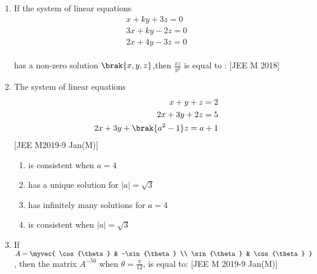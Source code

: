 \begin{enumerate}
\begin{enumerate}
\end{enumerate} 
\item If the system of linear equations \\
\begin{align}x+ky+3z=0 \\
3x+ky-2z=0 \\
2x+4y-3z=0 \end{align}\\
has a non-zero solution $$,then $$ is equal to :
\hfill{[JEE M 2018]}
\begin{enumerate}
\end{enumerate}
\item The system of linear equations \\
\begin{align}x+y+z=2 \\
2x+3y+2z=5 \\
2x+3y+\brak{a^2-1}z=a+1 \end{align} 
\hfill{[JEE M2019-9 Jan(M)]}
\begin{enumerate}

    

    \item is consistent when $a=4$
    \item has a unique solution for $|a|= $
    \item has infinitely many solutions for $a=4$
    \item is consistent when $|a|= $
    
\end{enumerate}
\item If $A= \myvec{
    \cos{\theta} & -\sin{\theta} \\
    \sin{\theta} & \cos{\theta}
}$, then the matrix $A^{-50}$ when $\theta=$, is equal to: 
\hfill{[JEE M 2019-9 Jan(M)]}
\begin{enumerate}
\begin{multicols}{2}


\end{multicols}
\end{enumerate}
\end{enumerate}
